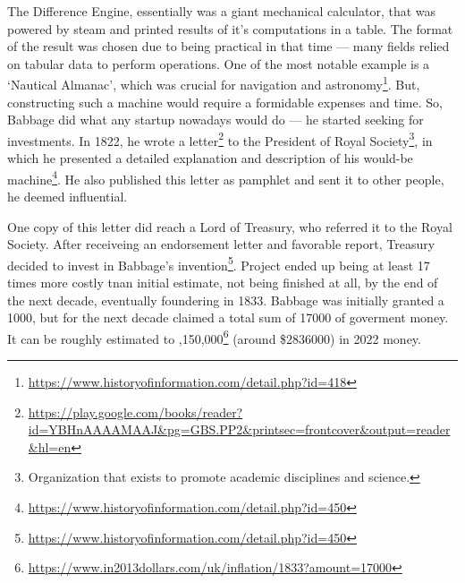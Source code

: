\documentclass{report}
\begin{document}
            The Difference Engine, essentially was a giant mechanical calculator, that was powered by steam and printed results of it's computations in a table. 
            The format of the result was chosen due to being practical in that time --- many fields relied on tabular data to perform operations. One of the most
            notable example is a `Nautical Almanac', which was crucial for navigation and astronomy\footnote{\href{https://www.historyofinformation.com/detail.php?id=418}
            {https://www.historyofinformation.com/detail.php?id=418}}. But, constructing such a machine would require a formidable expenses and time. So, Babbage did what
            any startup nowadays would do --- he started seeking for investments. 
            In 1822, he wrote a letter\footnote{\href{https://play.google.com/books/reader?id=YBHnAAAAMAAJ&pg=GBS.PP2&printsec=frontcover&output=reader&hl=en}
            {https://play.google.com/books/reader?id=YBHnAAAAMAAJ\&pg=GBS.PP2\&printsec=frontcover\&output=reader\&hl=en}}
            to the President of Royal Society\footnote{Organization that exists to promote academic disciplines and science.}, in which he presented a 
            detailed explanation and description of his would-be machine\footnote{\href{https://www.historyofinformation.com/detail.php?id=450}
            {https://www.historyofinformation.com/detail.php?id=450}}. He also published this letter as pamphlet and sent it to other people, he deemed influential. \par

            One copy of this letter did reach a Lord of Treasury, who referred it to the Royal Society. After receiveing an endorsement letter and favorable report, Treasury
            decided to invest in Babbage's invention\footnote{\href{https://www.historyofinformation.com/detail.php?id=450}{https://www.historyofinformation.com/detail.php?id=450}}.
            Project ended up being at least 17 times more costly tnan initial estimate, not being finished at all, by the end of the next decade, eventually foundering in 1833. Babbage
            was initially granted a \textsterling\num{1000}, but for the next decade claimed a total sum of \textsterling\num{17000} of goverment money. It can be roughly estimated to
            ,150,000\footnote{\href{https://www.in2013dollars.com/uk/inflation/1833?amount=17000}{https://www.in2013dollars.com/uk/inflation/1833?amount=17000}}
            (around \$\num{2836000}) in 2022 money. \par
\end{document}
